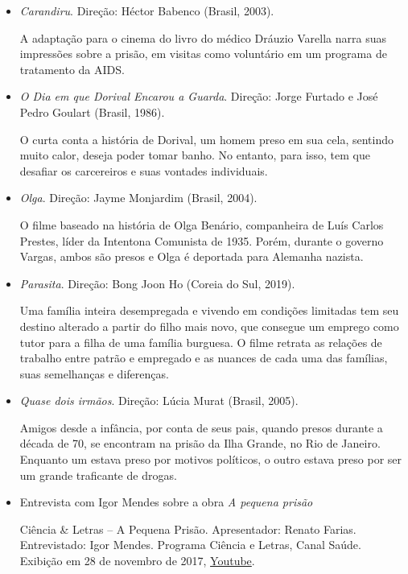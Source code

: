 \documentclass[11pt]{extarticle}
\begin{document}
\begin{itemize}
\item\textit{Carandiru}. Direção: Héctor Babenco (Brasil, 2003).

A adaptação para o cinema do livro do médico Dráuzio Varella narra suas 
impressões sobre a prisão, em visitas como voluntário em um programa 
de tratamento da AIDS.

\item\textit{O Dia em que Dorival Encarou a Guarda}. Direção: Jorge Furtado e José Pedro Goulart (Brasil, 1986).

O curta conta a história de Dorival, um homem preso em sua cela, 
sentindo muito calor, deseja poder tomar banho. No entanto, 
para isso, tem que desafiar os carcereiros e suas vontades 
individuais.

\item\textit{Olga}. Direção: Jayme Monjardim (Brasil, 2004).

O filme baseado na história de Olga Benário, companheira de Luís 
Carlos Prestes, líder da Intentona Comunista de 1935. Porém, durante 
o governo Vargas, ambos são presos e Olga é deportada para Alemanha 
nazista.

\item\textit{Parasita}. Direção: Bong Joon Ho (Coreia do Sul, 2019).

Uma família inteira desempregada e vivendo em condições limitadas tem 
seu destino alterado a partir do filho mais novo, que consegue um emprego 
como tutor para a filha de uma família burguesa. O filme retrata as relações 
de trabalho entre patrão e empregado e as nuances de cada uma das famílias, 
suas semelhanças e diferenças.

\item\textit{Quase dois irmãos}. Direção: Lúcia Murat (Brasil, 2005).

Amigos desde a infância, por conta de seus pais, quando presos durante 
a década de 70, se encontram na prisão da Ilha Grande, no Rio de Janeiro. 
Enquanto um estava preso por motivos políticos, o outro estava preso por 
ser um grande traficante de drogas.

\item Entrevista com Igor Mendes sobre a obra \emph{A pequena prisão}

Ciência \& Letras -- A Pequena Prisão. 
Apresentador: Renato Farias. Entrevistado: Igor Mendes. 
Programa Ciência e Letras, Canal Saúde. Exibição em 28 de novembro de 2017, \href{youtube.com/kwLs4aImRRM}{{Youtube}}.
\end{itemize}
\end{document}
